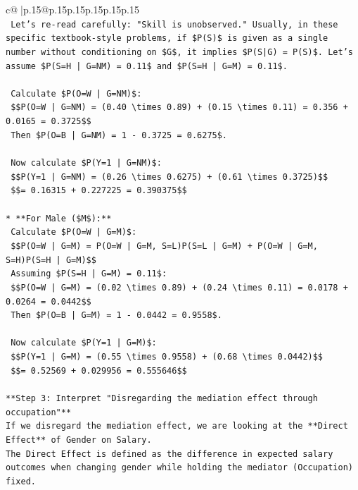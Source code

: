 \documentclass{article}
\begin{document}
{\begin{supertabular}{c@{$\;$}|p{.15\linewidth}@{}p{.15\linewidth}p{.15\linewidth}p{.15\linewidth}p{.15\linewidth}p{.15\linewidth}}
{{{\\ 
\texttt{    Let's re{-}read carefully: "Skill is unobserved." Usually, in these specific textbook{-}style problems, if \$P(S)\$ is given as a single number without conditioning on \$G\$, it implies \$P(S|G) = P(S)\$. Let's assume \$P(S=H | G=NM) = 0.11\$ and \$P(S=H | G=M) = 0.11\$.} \\
\\ 
\texttt{    Calculate \$P(O=W | G=NM)\$:} \\
\texttt{    \$\$P(O=W | G=NM) = (0.40 \textbackslash{}times 0.89) + (0.15 \textbackslash{}times 0.11) = 0.356 + 0.0165 = 0.3725\$\$} \\
\texttt{    Then \$P(O=B | G=NM) = 1 {-} 0.3725 = 0.6275\$.} \\
\\ 
\texttt{    Now calculate \$P(Y=1 | G=NM)\$:} \\
\texttt{    \$\$P(Y=1 | G=NM) = (0.26 \textbackslash{}times 0.6275) + (0.61 \textbackslash{}times 0.3725)\$\$} \\
\texttt{    \$\$= 0.16315 + 0.227225 = 0.390375\$\$} \\
\\ 
\texttt{*   **For Male (\$M\$):**} \\
\texttt{    Calculate \$P(O=W | G=M)\$:} \\
\texttt{    \$\$P(O=W | G=M) = P(O=W | G=M, S=L)P(S=L | G=M) + P(O=W | G=M, S=H)P(S=H | G=M)\$\$} \\
\texttt{    Assuming \$P(S=H | G=M) = 0.11\$:} \\
\texttt{    \$\$P(O=W | G=M) = (0.02 \textbackslash{}times 0.89) + (0.24 \textbackslash{}times 0.11) = 0.0178 + 0.0264 = 0.0442\$\$} \\
\texttt{    Then \$P(O=B | G=M) = 1 {-} 0.0442 = 0.9558\$.} \\
\\ 
\texttt{    Now calculate \$P(Y=1 | G=M)\$:} \\
\texttt{    \$\$P(Y=1 | G=M) = (0.55 \textbackslash{}times 0.9558) + (0.68 \textbackslash{}times 0.0442)\$\$} \\
\texttt{    \$\$= 0.52569 + 0.029956 = 0.555646\$\$} \\
\\ 
\texttt{**Step 3: Interpret "Disregarding the mediation effect through occupation"**} \\
\texttt{If we disregard the mediation effect, we are looking at the **Direct Effect** of Gender on Salary.} \\
\texttt{The Direct Effect is defined as the difference in expected salary outcomes when changing gender while holding the mediator (Occupation) fixed.} \\
}}}
\end{supertabular}}
\end{document}
